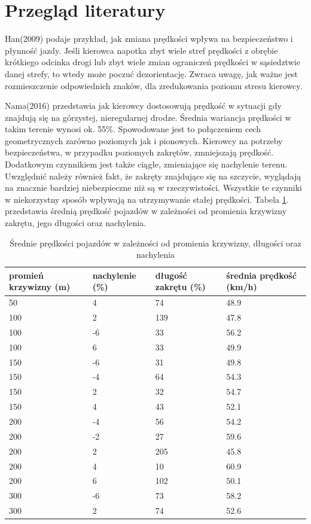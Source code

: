 \section{Przegląd literatury}
\label{sec:przegladLiteratury}

Han(2009) podaje przykład, jak zmiana prędkości wpływa na bezpieczeństwo i płynność jazdy. Jeśli kierowca napotka zbyt wiele stref prędkości z obrębie krótkiego odcinka drogi lub zbyt wiele zmian ograniczeń prędkości w sąsiedztwie danej strefy, to wtedy może poczuć dezorientację. Zwraca uwagę, jak ważne jest rozmieszczenie odpowiednich znaków, dla zredukowania poziomu stresu kierowcy.

Nama(2016) przedstawia jak kierowcy dostosowują prędkość w sytuacji gdy znajdują się na górzystej, nieregularnej drodze. Średnia wariancja prędkości w takim terenie wynosi ok. 55\%. Spowodowane jest to połączeniem cech geometrycznych zarówno poziomych jak i pionowych. Kierowcy na potrzeby bezpieczeństwa, w przypadku poziomych zakrętów, zmniejszają prędkość. Dodatkowym czynnikiem jest także ciągłe, zmieniające się nachylenie terenu. Uwzględnić należy również fakt, że zakręty znajdujące się na szczycie, wyglądają na znacznie bardziej niebezpieczne niż są w rzeczywistości. Wszystkie te czynniki w niekorzystny sposób wpływają na utrzymywanie stałej prędkości. Tabela \ref{predkosciPromienKrzywizny}. przedstawia średnią prędkość pojazdów w zależności od promienia krzywizny zakrętu, jego długości oraz nachylenia.


\begin{table}[ht]
\centering
\caption{Średnie prędkości pojazdów w zależności od promienia krzywizny, długości oraz nachylenia}
\label{predkosciPromienKrzywizny}
\begin{tabular}{| l | l | l | l | }
\hline
\textbf{promień krzywizny (m)} & \textbf{nachylenie (\%)} & \textbf{długość zakrętu (\%)} & \textbf{średnia prędkość (km/h)} \\ \hline
50 & 4 & 74 & 48.9\\ \hline
100 & 2 & 139 & 47.8\\ \hline
100 & -6 & 33 & 56.2\\ \hline
100 & 6 & 33 & 49.9\\ \hline
150 & -6 & 31 & 49.8\\ \hline
150 & -4 & 64 & 54.3\\ \hline
150 & 2 & 32 & 54.7\\ \hline
150 & 4 & 43 & 52.1\\ \hline
200 & -4 & 56 & 54.2\\ \hline
200 & -2 & 27 & 59.6\\ \hline
200 & 2 & 205 & 45.8\\ \hline
200 & 4 & 10 & 60.9\\ \hline
200 & 6 & 102 & 50.1\\ \hline
300 & -6 & 73 & 58.2\\ \hline
300 & 2 & 74 & 52.6\\ \hline

\end{tabular}
\end{table}

